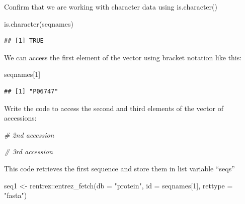 \documentclass[
]{book}
\newenvironment{Shaded}{\begin{snugshade}}{\end{snugshade}}
\newcommand{\AttributeTok}[1]{\textcolor[rgb]{0.77,0.63,0.00}{#1}}
\newcommand{\CommentTok}[1]{\textcolor[rgb]{0.56,0.35,0.01}{\textit{#1}}}
\newcommand{\DecValTok}[1]{\textcolor[rgb]{0.00,0.00,0.81}{#1}}
\newcommand{\FunctionTok}[1]{\textcolor[rgb]{0.00,0.00,0.00}{#1}}
\newcommand{\NormalTok}[1]{#1}
\newcommand{\OtherTok}[1]{\textcolor[rgb]{0.56,0.35,0.01}{#1}}
\newcommand{\SpecialCharTok}[1]{\textcolor[rgb]{0.00,0.00,0.00}{#1}}
\newcommand{\StringTok}[1]{\textcolor[rgb]{0.31,0.60,0.02}{#1}}
\begin{document}
Confirm that we are working with character data using is.character()

\begin{Shaded}
\begin{Highlighting}[]
\FunctionTok{is.character}\NormalTok{(seqnames)}
\end{Highlighting}
\end{Shaded}

\begin{verbatim}
## [1] TRUE
\end{verbatim}

We can access the first element of the vector using bracket notation like this:

\begin{Shaded}
\begin{Highlighting}[]
\NormalTok{seqnames[}\DecValTok{1}\NormalTok{]}
\end{Highlighting}
\end{Shaded}

\begin{verbatim}
## [1] "P06747"
\end{verbatim}

Write the code to access the second and third elements of the vector of accessions:

\begin{Shaded}
\begin{Highlighting}[]
\CommentTok{\# 2nd accession}


\CommentTok{\# 3rd accession}
\end{Highlighting}
\end{Shaded}

This code retrieves the first sequence and store them in list variable ``seqs''

\begin{Shaded}
\begin{Highlighting}[]
\NormalTok{seq1 }\OtherTok{\textless{}{-}}\NormalTok{ rentrez}\SpecialCharTok{::}\FunctionTok{entrez\_fetch}\NormalTok{(}\AttributeTok{db =} \StringTok{"protein"}\NormalTok{, }
                          \AttributeTok{id =}\NormalTok{ seqnames[}\DecValTok{1}\NormalTok{], }
                          \AttributeTok{rettype =} \StringTok{"fasta"}\NormalTok{)      }
\end{Highlighting}
\end{Shaded}
\end{document}
